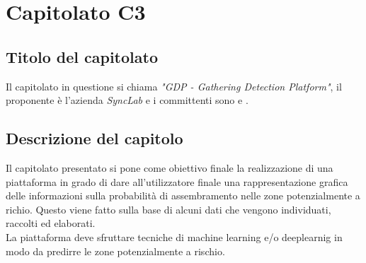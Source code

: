\section{Capitolato C3}
\subsection{Titolo del capitolato}
Il capitolato in questione si chiama \textit{"GDP - Gathering Detection Platform"}, il proponente \`e l'azienda \textit{SyncLab} e i committenti sono \VT{} e \CR{}.

\subsection{Descrizione del capitolo}
Il capitolato presentato si pone come obiettivo finale la realizzazione di una piattaforma in grado di dare all'utilizzatore finale una rappresentazione grafica delle informazioni sulla probabilità di assembramento nelle zone potenzialmente a richio. Questo viene fatto sulla base di alcuni dati che vengono individuati, raccolti ed elaborati. \\
La piattaforma deve sfruttare tecniche di machine learning e/o deeplearnig in modo da predirre le zone potenzialmente a rischio.

